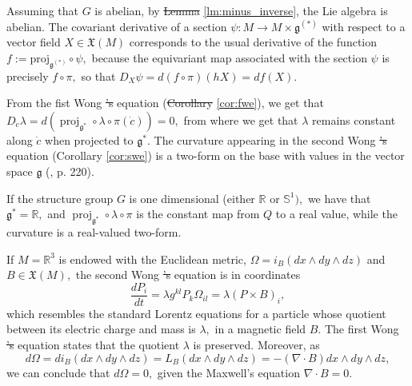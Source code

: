 \documentclass[12pt, letterpaper, reqno]{amsart}
\theoremstyle{definition}
\theoremstyle{plain}
\theoremstyle{remark}
\providecommand{\DIFadd}[1]{{\protect\color{blue}\uwave{#1}}} %
\providecommand{\DIFdel}[1]{{\protect\color{red}\sout{#1}}}                      %
\providecommand{\DIFaddbegin}{} %
\providecommand{\DIFaddend}{} %
\providecommand{\DIFdelbegin}{} %
\providecommand{\DIFdelend}{} %
\newcommand{\DIFscaledelfig}{0.5}
\newlength{\DIFdelgraphicswidth} %
\newlength{\DIFdelgraphicsheight} %
\newcommand{\DIFaddincludegraphics}[2][]{{\color{blue}\fbox{\DIFOincludegraphics[#1]{#2}}}} %
\newcommand{\DIFdelincludegraphics}[2][]{%
\sbox{\DIFdelgraphicsbox}{\DIFOincludegraphics[#1]{#2}}%
\settoboxwidth{\DIFdelgraphicswidth}{\DIFdelgraphicsbox} %
\settoboxtotalheight{\DIFdelgraphicsheight}{\DIFdelgraphicsbox} %
\scalebox{\DIFscaledelfig}{%
\parbox[b]{\DIFdelgraphicswidth}{\usebox{\DIFdelgraphicsbox}\\[-\baselineskip] \rule{\DIFdelgraphicswidth}{0em}}\llap{\resizebox{\DIFdelgraphicswidth}{\DIFdelgraphicsheight}{%
\setlength{\unitlength}{\DIFdelgraphicswidth}%
\begin{picture}(1,1)%
\thicklines\linethickness{2pt} %
{\color[rgb]{1,0,0}\put(0,0){\framebox(1,1){}}}%
{\color[rgb]{1,0,0}\put(0,0){\line( 1,1){1}}}%
{\color[rgb]{1,0,0}\put(0,1){\line(1,-1){1}}}%
\end{picture}%
}\hspace*{3pt}}} %
} %
\DeclareRobustCommand{\DIFaddbegin}{\DIFOaddbegin \let\includegraphics\DIFaddincludegraphics} %
\DeclareRobustCommand{\DIFaddend}{\DIFOaddend \let\includegraphics\DIFOincludegraphics} %
\DeclareRobustCommand{\DIFdelbegin}{\DIFOdelbegin \let\includegraphics\DIFdelincludegraphics} %
\DeclareRobustCommand{\DIFdelend}{\DIFOaddend \let\includegraphics\DIFOincludegraphics} %
\begin{document}
Assuming that $ G$ is abelian, by \DIFdelbegin \DIFdel{Lemma }\DIFdelend \DIFaddbegin \DIFadd{lemma }\DIFaddend \ref{lm:minus_inverse}, the Lie algebra is abelian. The covariant derivative  of a section $ \psi: M \rightarrow M\times \mathfrak{g}^{(*)} $ with respect to a vector field $ X\in \mathfrak{X}(M) $ corresponds to the usual derivative of the function $f:= \operatorname{proj_{ \mathfrak{g}^{(*)}}}\circ \psi,$ because the equivariant map associated with the section $ \psi $ is precisely $ f\circ\pi, $ so that $ D_X\psi=d(f\circ\pi)(hX) = df(X). $ 

From the fist Wong \DIFdelbegin \DIFdel{'s }\DIFdelend equation (\DIFdelbegin \DIFdel{Corollary }\DIFdelend \DIFaddbegin \DIFadd{corollary }\DIFaddend \ref{cor:fwe}), we get that $ D_{\dot{c}}\lambda = d( \operatorname{proj}_{ \mathfrak{g}^*}\circ \lambda\circ\pi(\dot{c}))=0, $ from where we get that $ \lambda $ remains constant along $ \dot{c} $ when projected to $ \mathfrak{g}^{*}. $ The curvature appearing in the second Wong \DIFdelbegin \DIFdel{'s }\DIFdelend equation (Corollary \ref{cor:swe}) is a two-form on the base with values in the vector space $ \mathfrak{g} $ (\cite{montgomery2002tour}, p. 220).

If the structure group $ G $ is one dimensional (either $ \mathbb{R} $ or $ \mathbb{S}^1), $ we have that $ \mathfrak{g}^*= \mathbb{R}, $ and $ \operatorname{proj}_{ \mathfrak{g}^*} \circ\lambda\circ\pi $ is the constant map from $ Q $ to a real value, while the curvature is a real-valued two-form.

If $ M = \mathbb{R}^3$ is endowed with the Euclidean metric, $ \Omega = i_B(dx\wedge dy\wedge dz) $ and $ B\in \mathfrak{X}(M), $ the second Wong \DIFdelbegin \DIFdel{'s }\DIFdelend equation is in coordinates 
$$ \frac{d P_i}{dt} = \lambda g^{kl} P_k \Omega_{il} = \lambda (P\times B)_i, $$ 
which resembles the standard Lorentz equations for a particle whose quotient between its electric charge and mass is $ \lambda, $ in a magnetic field $ B. $ The first Wong \DIFdelbegin \DIFdel{'s }\DIFdelend equation states that the quotient $\lambda$ is preserved. Moreover, as
\begin{dmath*}
	d\Omega = di_B(dx\wedge dy\wedge dz) = L_B(dx\wedge dy\wedge dz) = -(\nabla\cdot B) dx\wedge dy\wedge dz,	
\end{dmath*}
we can conclude that $ d\Omega=0, $ given the Maxwell's equation $ \nabla\cdot B=0. $ 
\newpage

\nocite{*}

\end{document}
